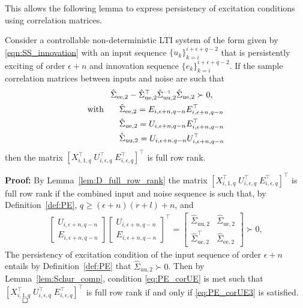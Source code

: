 This allows the following lemma to express persistency of excitation conditions using correlation matrices.
\begin{lem}\label{lem:D_full_row_rank2}
    Consider a controllable non-deterministic \ac{LTI} system of the form given by \eqref{eqn:SS_innovation} with an input sequence $\{u_k\}_{k=i}^{i+\epsilon+q-2}$ that is persistently exciting of order $\epsilon+n$ and innovation sequence $\{e_k\}_{k=i}^{i+\epsilon+q-2}$. If the sample correlation matrices between inputs and noise are such that
    \begin{align}
        & \span\span \hat{\Sigma}_{\mathrm{ee},2} - \hat{\Sigma}_{\mathrm{ue},2}^\top \hat{\Sigma}_{\mathrm{uu},2}\inv \hat{\Sigma}_{\mathrm{ue},2} \succ 0,\label{eq:PE_corUE3}\\
        & \text{with}\;\;\;&&\hat{\Sigma}_{\mathrm{ee},2}=E_{i,\epsilon+n,q-n}E_{i,\epsilon+n,q-n}^\top\notag\\
        & &&\hat{\Sigma}_{\mathrm{ue},2}=U_{i,\epsilon+n,q-n}E_{i,\epsilon+n,q-n}^\top\notag\\
        & &&\hat{\Sigma}_{\mathrm{uu},2}=U_{i,\epsilon+n,q-n}U_{i,\epsilon+n,q-n}^\top\notag
    \end{align}
    then the matrix $\left[X_{i,1,q}^\top\;U_{i,\epsilon,q}^\top\;E_{i,\epsilon,q}^\top\right]^\top$ is full row rank.
\end{lem}
\textbf{Proof:} By Lemma~\ref{lem:D_full_row_rank} the matrix $\left[X_{i,1,q}^\top\;U_{i,\epsilon,q}^\top\;E_{i,\epsilon,q}^\top\right]^\top$ is full row rank if the combined input and noise sequence is such that, by Definition~\ref{def:PE}, $q\geq(\epsilon+n)(r+l)+n$, and
\begin{align}\label{eq:PE_corUE}
    \begin{bmatrix}
        U_{i,\epsilon+n,q-n}\\
        E_{i,\epsilon+n,q-n}
    \end{bmatrix}\!\!
    \begin{bmatrix}
        U_{i,\epsilon+n,q-n}\\
        E_{i,\epsilon+n,q-n}
    \end{bmatrix}^\top\!=
    \begin{bmatrix}
        \hat{\Sigma}_{\mathrm{uu},2} & \hat{\Sigma}_{\mathrm{ue},2}\\
        \hat{\Sigma}_{\mathrm{ue},2}^\top & \hat{\Sigma}_{\mathrm{ee},2}
    \end{bmatrix}\succ 0,
\end{align}
The persistency of excitation condition of the input sequence of order $\epsilon+n$ entails by Definition~\ref{def:PE} that ${\hat{\Sigma}_{\mathrm{uu},2}\succ0}$. Then by Lemma~\ref{lem:Schur_comp}, condition \eqref{eq:PE_corUE} is met such that $\left[X_{i,1,q}^\top\;U_{i,\epsilon,q}^\top\;E_{i,\epsilon,q}^\top\right]^\top$ is full row rank if and only if \eqref{eq:PE_corUE3} is satisfied.$\hfill\qed$
